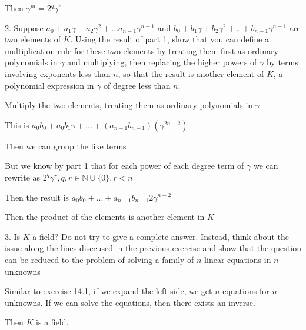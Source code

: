 \documentclass[12pt]{article}
\begin{document}
\begin{itemize}
	Then $\gamma^m = 2^{q} \gamma^{r}$

	2. Suppose $a_0 + a_1 \gamma + a_2 \gamma^2 + ... a_{n-1} \gamma^{n-1}$ and $b_0 + b_1\gamma + b_2 \gamma^2 + .. + b_{n-1}\gamma^{n-1}$ are two elements of $K$. Using the result of part 1, show that you can define a multiplication rule for these two elements by treating them first as ordinary polynomials in $\gamma$ and multiplying, then replacing the higher powers of $\gamma$ by terms involving exponents less than $n$, so that the result is another element of $K$, a polynomial expression in $\gamma$ of degree less than $n$. 

	Multiply the two elements, treating them as ordinary polynomials in $\gamma$

	This is $a_0b_0 + a_0 b_1 \gamma + ... + (a_{n-1}b_{n-1})(\gamma^{2n-2})$

	Then we can group the like terms

	But we know by part 1 that for each power of each degree term of $\gamma$ we can rewrite as $2^{q} \gamma^{r}, q,r \in\mathbb{N}\cup \{0\}, r < n$

	Then the result is $a_0b_0 + ... + a_{n-1}b_{n-1}2\gamma^{n-2}$

	Then the product of the elements is another element in $K$

	3. Is $K$ a field? Do not try to give a complete answer. Instead, think about the issue along the lines disccused in the previous exercise and show that the question can be reduced to the problem of solving a family of $n$ linear equations in $n$ unknowns

	Similar to exercise 14.1, if we expand the left side, we get $n$ equations for $n$ unknowns. If we can solve the equations, then there exists an inverse.

	Then $K$ is a field.
\end{itemize}
\end{document}
